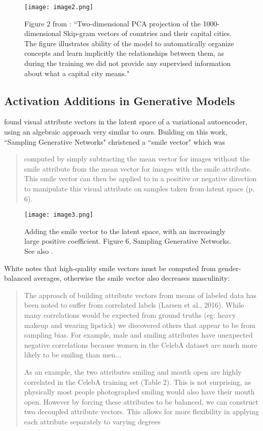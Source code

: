 \documentclass[10pt]{article}
\begin{document}
\begin{figure*}[h]
\centering
\texttt{[image: image2.png]}
\caption{Figure 2 from \citet{NIPS2013_9aa42b31}: ``Two-dimensional PCA projection of the 1000-dimensional Skip-gram vectors of countries and their capital cities. The figure illustrates ability of the model to automatically organize concepts and learn implicitly the relationships between them, as during the training we did not provide any supervised information about what a capital city means."}
\label{fig:image2}
\end{figure*}


\subsection{Activation Additions in Generative Models}
\citet{10.5555/3045390.3045555} found visual attribute vectors in the latent space of a variational autoencoder, using an algebraic approach very similar to ours. Building on this work, \citet{white2016sampling} ``Sampling Generative Networks" christened a ``smile vector" which was

\begin{quote}
computed by simply subtracting the mean vector for images without the smile attribute from the mean vector for images with the smile attribute. This smile vector can then be applied to in a positive or negative direction to manipulate this visual attribute on samples taken from latent space (p. 6).
\end{quote}

\begin{figure}[h]
\texttt{[image: image3.png]}
\caption{Adding the smile vector to the latent space, with an increasingly large positive coefficient. Figure 6, Sampling Generative Networks. See also \citet{DBLP:journals/corr/RadfordMC15}.}
\label{fig:image3}
\end{figure}

White notes that high-quality smile vectors must be computed from gender-balanced averages, otherwise the smile vector also decreases masculinity:

\begin{quotation}
The approach of building attribute vectors from means of labeled data has been noted to suffer from correlated labels (Larsen et al., 2016). While many correlations would be expected from ground truths (eg: heavy makeup and wearing lipstick) we discovered others that appear to be from sampling bias. For example, male and smiling attributes have unexpected negative correlations because women in the CelebA dataset are much more likely to be smiling than men...

As an example, the two attributes smiling and mouth open are highly correlated in the CelebA training set (Table 2). This is not surprising, as
physically most people photographed smiling would also have their mouth open. However by forcing these attributes to be balanced, we can construct two decoupled attribute vectors. This allows for more flexibility in applying each attribute separately to varying degrees
\end{quotation}
\end{document}
